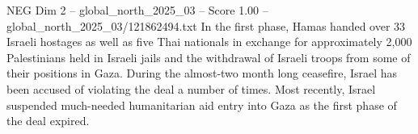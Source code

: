 \begin{textsample}{NEG Dim 2 – global\_north\_2025\_03 – Score 1.00 – global\_north\_2025\_03/121862494.txt}
In the first phase, Hamas handed over 33 Israeli hostages as well as five Thai nationals in exchange for approximately 2,000 Palestinians held in Israeli jails and the withdrawal of Israeli troops from some of their positions in Gaza.
During the almost-two month long ceasefire, Israel has been accused of violating the deal a number of times.
Most recently, Israel suspended much-needed humanitarian aid entry into Gaza as the first phase of the deal expired.

\end{textsample}
